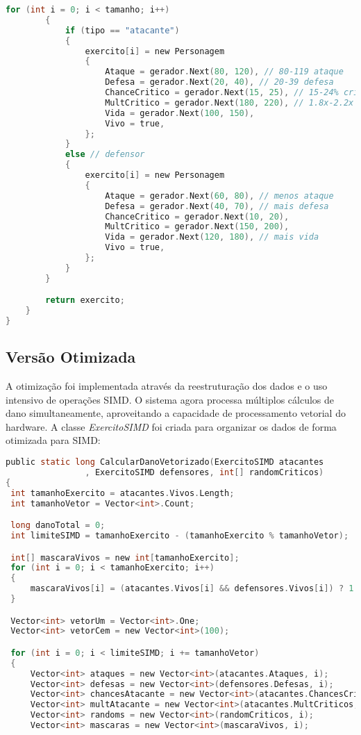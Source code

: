 \documentclass[
	12pt,				%
	oneside,			%
	a4paper,			%
	english,			%
	brazil,				%
	]{abntex2}
\begin{document}
{\begin{lstlisting}[language=C]
        for (int i = 0; i < tamanho; i++)
        {
            if (tipo == "atacante")
            {
                exercito[i] = new Personagem
                {
                    Ataque = gerador.Next(80, 120), // 80-119 ataque
                    Defesa = gerador.Next(20, 40), // 20-39 defesa
                    ChanceCritico = gerador.Next(15, 25), // 15-24% crítico
                    MultCritico = gerador.Next(180, 220), // 1.8x-2.2x crítico
                    Vida = gerador.Next(100, 150),
                    Vivo = true,
                };
            }
            else // defensor
            {
                exercito[i] = new Personagem
                {
                    Ataque = gerador.Next(60, 80), // menos ataque
                    Defesa = gerador.Next(40, 70), // mais defesa
                    ChanceCritico = gerador.Next(10, 20),
                    MultCritico = gerador.Next(150, 200),
                    Vida = gerador.Next(120, 180), // mais vida
                    Vivo = true,
                };
            }
        }

        return exercito;
    }
}
\end{lstlisting}
\subsection{Versão Otimizada}
A otimização foi implementada através da reestruturação dos dados e o uso intensivo de operações SIMD. O sistema agora processa múltiplos cálculos de dano simultaneamente, aproveitando a capacidade de processamento vetorial do hardware.
A classe \textit{ExercitoSIMD} foi criada para organizar os dados de forma otimizada para SIMD:
\begin{lstlisting}[language=C]
public static long CalcularDanoVetorizado(ExercitoSIMD atacantes
                , ExercitoSIMD defensores, int[] randomCriticos)
{
 int tamanhoExercito = atacantes.Vivos.Length;
 int tamanhoVetor = Vector<int>.Count;

 long danoTotal = 0;
 int limiteSIMD = tamanhoExercito - (tamanhoExercito % tamanhoVetor);

 int[] mascaraVivos = new int[tamanhoExercito];
 for (int i = 0; i < tamanhoExercito; i++)
 {
     mascaraVivos[i] = (atacantes.Vivos[i] && defensores.Vivos[i]) ? 1 : 0;
 }

 Vector<int> vetorUm = Vector<int>.One;
 Vector<int> vetorCem = new Vector<int>(100);

 for (int i = 0; i < limiteSIMD; i += tamanhoVetor)
 {
     Vector<int> ataques = new Vector<int>(atacantes.Ataques, i);
     Vector<int> defesas = new Vector<int>(defensores.Defesas, i);
     Vector<int> chancesAtacante = new Vector<int>(atacantes.ChancesCritico, i);
     Vector<int> multAtacante = new Vector<int>(atacantes.MultCriticos, i);
     Vector<int> randoms = new Vector<int>(randomCriticos, i);
     Vector<int> mascaras = new Vector<int>(mascaraVivos, i);


\end{lstlisting}}
\end{document}
